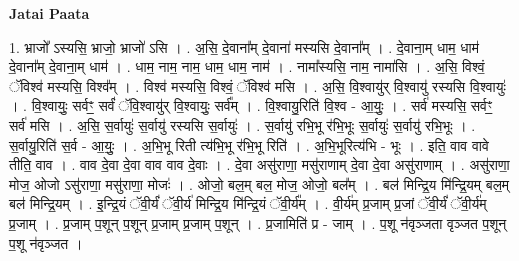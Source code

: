 \documentclass[17pt]{extarticle}
\begin{document}
\textbf{Jatai Paata} \newline

1. भ्राजो᳚ ऽस्यसि॒ भ्राजो॒ भ्राजो॑ ऽसि । . अ॒सि॒ दे॒वाना᳚म् दे॒वाना॑ मस्यसि दे॒वाना᳚म् । . दे॒वाना॒म् धाम॒ धाम॑ दे॒वाना᳚म् दे॒वाना॒म् धाम॑ । . धाम॒ नाम॒ नाम॒ धाम॒ धाम॒ नाम॑ । . नामा᳚स्यसि॒ नाम॒ नामा॑सि । . अ॒सि॒ विश्वं॒ ॅविश्व॑ मस्यसि॒ विश्व᳚म् । . विश्व॑ मस्यसि॒ विश्वं॒ ॅविश्व॑ मसि । . अ॒सि॒ वि॒श्वायु॑र् वि॒श्वायु॑ रस्यसि वि॒श्वायुः॑ । . वि॒श्वायुः॒ सर्वꣳ॒॒ सर्वं॑ ॅवि॒श्वायु॑र् वि॒श्वायुः॒ सर्व᳚म् । . वि॒श्वायु॒रिति॑ वि॒श्व - आ॒युः॒ । . सर्व॑ मस्यसि॒ सर्वꣳ॒॒ सर्व॑ मसि । . अ॒सि॒ स॒र्वायुः॑ स॒र्वायु॑ रस्यसि स॒र्वायुः॑ । . स॒र्वायु॑ रभि॒भू र॑भि॒भूः स॒र्वायुः॑ स॒र्वायु॑ रभि॒भूः । . स॒र्वायु॒रिति॑ स॒र्व - आ॒युः॒ । . अ॒भि॒भू रिती त्य॑भि॒भू र॑भि॒भू रिति॑ । . अ॒भि॒भूरित्य॑भि - भूः । . इति॒ वाव वावे तीति॒ वाव । . वाव दे॒वा दे॒वा वाव वाव दे॒वाः । . दे॒वा असु॑राणा॒ मसु॑राणाम् दे॒वा दे॒वा असु॑राणाम् । . असु॑राणा॒ मोज॒ ओजो ऽसु॑राणा॒ मसु॑राणा॒ मोजः॑ । . ओजो॒ बल॒म् बल॒ मोज॒ ओजो॒ बल᳚म् । . बल॑ मिन्द्रि॒य मि॑न्द्रि॒यम् बल॒म् बल॑ मिन्द्रि॒यम् । . इ॒न्द्रि॒यं ॅवी॒र्यं॑ ॅवी॒र्य॑ मिन्द्रि॒य मि॑न्द्रि॒यं ॅवी॒र्य᳚म् । . वी॒र्य॑म् प्र॒जाम् प्र॒जां ॅवी॒र्यं॑ ॅवी॒र्य॑म् प्र॒जाम् । . प्र॒जाम् प॒शून् प॒शून् प्र॒जाम् प्र॒जाम् प॒शून् । . प्र॒जामिति॑ प्र - जाम् । . प॒शू न॑वृञ्जता वृञ्जत प॒शून् प॒शू न॑वृञ्जत । \newline
\end{document}
